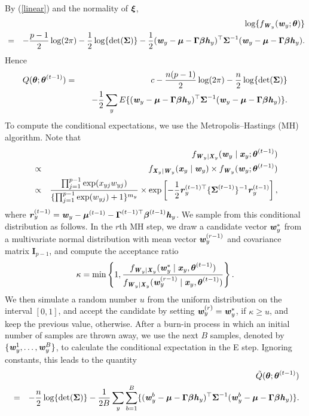 \documentclass[12pt]{article}
\def \bfith{\mbox{\textbf{\textit{h}}}}
\def \bfitr{\mbox{\textbf{\textit{r}}}}
\def \bfitw{\mbox{\textbf{\textit{w}}}}
\def \bfitx{\mbox{\textbf{\textit{x}}}}
\def \sbfitW{\mbox{\scriptsize\textbf{\textit{W}}}}
\def \sbfitX{\mbox{\scriptsize\textbf{\textit{X}}}}
\def \bfbeta{\mbox{\boldmath $\beta$}}
\def \bfmu{\mbox{\boldmath $\mu$}}
\def \bftheta{\mbox{\boldmath $\theta$}}
\def \bfxi{\mbox{\boldmath $\xi$}}
\def \I{\mathbf{I}}
\def \bfGamma{\mbox{\boldmath $\Gamma$}}
\def \bfSigma{\mbox{\boldmath $\Sigma$}}
\begin{document}
By (\ref{linear}) and the normality of $\bfxi$,
\begin{eqnarray}
\nonumber
&&\log\{f_{\sbfitW_y}(\bfitw_y; \bftheta)\} \\ \nonumber
&=& -\frac{p - 1}{2}\log(2\pi) - \frac{1}{2}\log\{\operatorname{det}(\bfSigma)\} - \frac{1}{2} (\bfitw_y - \bfmu - \bfGamma\bfbeta \bfith_y)^{\top} \bfSigma^{-1} (\bfitw_y - \bfmu - \bfGamma\bfbeta \bfith_y).
\end{eqnarray}
Hence
\begin{eqnarray}
\nonumber
 Q(\bftheta; \bftheta^{(t - 1)}) &=& c - \frac{n(p - 1)}{2}\log(2\pi) - \frac{n}{2}\log\{\operatorname{det}(\bfSigma)\} \\
&& \quad -\frac{1}{2}\sum_{y} E\{(\bfitw_y - \bfmu - \bfGamma\bfbeta \bfith_y)^{\top} \bfSigma^{-1} (\bfitw_y - \bfmu - \bfGamma\bfbeta \bfith_y)\}.
\end{eqnarray}
To compute the conditional expectations, we use the Metropolis--Hastings (MH) algorithm. Note that
\begin{eqnarray}
\nonumber
&& f_{\sbfitW_y \mid \sbfitX_y}(\bfitw_y \mid \bfitx_y; \bftheta^{(t - 1)}) \\ \nonumber
&\propto& f_{\sbfitX_y \mid \sbfitW_y}(\bfitx_y \mid \bfitw_y) \times f_{\sbfitW_y}(\bfitw_y; \bftheta^{(t - 1)}) \\ \nonumber
&\propto& \frac{\prod_{j = 1}^{p - 1} \exp(x_{yj} w_{yj})}{\{\prod_{j = 1}^{p - 1} \exp(w_{yj}) + 1\}^{m_y}} \times \exp\left[-\frac{1}{2} \bfitr_y^{(t - 1)\top} \{\bfSigma^{(t - 1)}\}^{-1} \bfitr_y^{(t - 1)}\right],
\end{eqnarray}
where $\bfitr_y^{(t - 1)} = \bfitw_y - \bfmu^{(t - 1)} - \bfGamma^{(t - 1)\top} \bfbeta^{(t - 1)} \bfith_y$. We sample from this conditional distribution as follows. In the $r$th MH step, we draw a candidate vector $\bfitw_y^*$ from a multivariate normal distribution with mean vector $\bfitw_y^{(r - 1)}$ and covariance matrix $\I_{p - 1}$, and compute the acceptance ratio
$$\kappa = \min\left\{1, \frac{f_{\sbfitW_y \mid \sbfitX_y}(\bfitw_y^* \mid \bfitx_y, \bftheta^{(t - 1)})}{f_{\sbfitW_y \mid \sbfitX_y}(\bfitw_y^{(r - 1)} \mid \bfitx_y, \bftheta^{(t - 1)})}\right\}.$$
We then simulate a random number $u$ from the uniform distribution on the interval $[0, 1]$, and accept the candidate by setting $\bfitw_y^{(r)} = \bfitw_y^*$, if $\kappa \geq u$, and keep the previous value, otherwise. After a burn-in process in which an initial number of samples are thrown away, we use the next $B$ samples, denoted by $\{\bfitw_{y}^{1}, \ldots, \bfitw_{y}^{B}\}$, to calculate the conditional expectation in the E step. Ignoring constants, this leads to the quantity
\begin{eqnarray}
\nonumber
&& \tilde{Q}(\bftheta; \bftheta^{(t - 1)}) \\ \nonumber
&=& - \frac{n}{2}\log\{\operatorname{det}(\bfSigma)\} - \frac{1}{2B}\sum_{y} \sum_{b = 1}^{B}\{(\bfitw_y^b - \bfmu - \bfGamma\bfbeta \bfith_y)^{\top} \bfSigma^{-1} (\bfitw_y^b - \bfmu - \bfGamma\bfbeta \bfith_y)\}.
\end{eqnarray}
\end{document}
